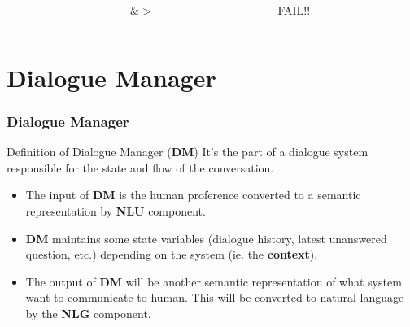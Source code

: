 \documentclass[11pt]{beamer}
\begin{document}
\begin{frame}
\begin{columns}
\begin{column}{0.45\textwidth}
\begin{scriptsize}
\begin{bmatrix}
														
		\end{bmatrix}$
		\end{scriptsize}
		\end{column}
		
		\begin{column}{0.1\textwidth}
		\pause
		\&$>$
		\end{column}
		
		\begin{column}{0.45\textwidth}
		FAIL!!
		\end{column}
\end{columns}
\end{frame}

\section{Dialogue Manager}

\begin{frame}
\frametitle{Dialogue Manager}
	\begin{block}{Definition of Dialogue Manager (\textbf{DM})}
		\vspace{10pt}
		It's the part of a dialogue system responsible for the state and flow of the conversation.
		\vspace{10pt}
		\pause
		\begin{itemize}
			\item The input of \textbf{DM} is the human proference converted to a semantic representation by \textbf{NLU} component.
			\item \textbf{DM} maintains some state variables (dialogue history, latest unanswered question, etc.) depending on the system (ie. the \textbf{context}).
			\item The output of \textbf{DM} will be another semantic representation of what system want to communicate to human. This will be converted to natural language by the \textbf{NLG} component.
		\end{itemize}
	\end{block}
\end{frame}
\end{document}
